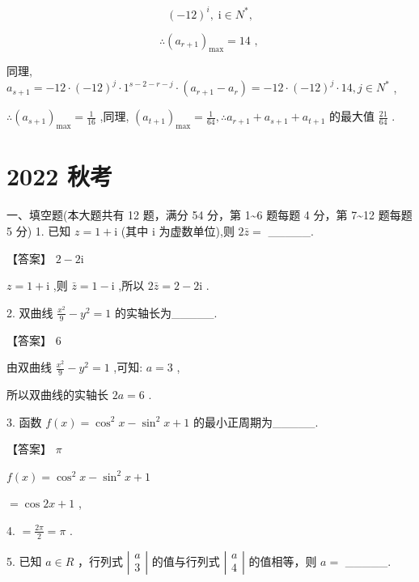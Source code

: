 \documentclass[10pt]{article}
\begin{document}
\[
{\left( -{12}\right) }^{i},\;\mathrm{i} \in  {N}^{ * },
\]

\[
\therefore {\left( {a}_{r + 1}\right) }_{\max } = {14}\text{ , }
\]

同理, \({a}_{s + 1} =  - {12} \cdot  {\left( -{12}\right) }^{j} \cdot  {1}^{s - 2 - r - j} \cdot  \left( {{a}_{r + 1} - {a}_{r}}\right)  =  - {12} \cdot  {\left( -{12}\right) }^{j} \cdot  {14},j \in  {N}^{ * }\) ,

\(\therefore {\left( {a}_{s + 1}\right) }_{\max } = \frac{1}{16}\) ,同理, \({\left( {a}_{t + 1}\right) }_{\max } = \frac{1}{64},\therefore {a}_{r + 1} + {a}_{s + 1} + {a}_{t + 1}\) 的最大值 \(\frac{21}{64}\) .

\section*{2022 秋考}

一、填空题(本大题共有 12 题，满分 54 分，第 1\textasciitilde 6 题每题 4 分，第 7\textasciitilde 12 题每题 5 分) 1. 已知 \(z = 1 + \mathrm{i}\) (其中 \(\mathrm{i}\) 为虚数单位),则 \(2\bar{z} =\) \_\_\_\_\_.

【答案】 \(2 - 2\mathrm{i}\)

\(z = 1 + \mathrm{i}\) ,则 \(\bar{z} = 1 - \mathrm{i}\) ,所以 \(2\bar{z} = 2 - 2\mathrm{i}\) .

2. 双曲线 \(\frac{{x}^{2}}{9} - {y}^{2} = 1\) 的实轴长为\_\_\_\_\_.

【答案】 6

由双曲线 \(\frac{{x}^{2}}{9} - {y}^{2} = 1\) ,可知: \(a = 3\) ,

所以双曲线的实轴长 \({2a} = 6\) .

3. 函数 \(f\left( x\right)  = {\cos }^{2}x - {\sin }^{2}x + 1\) 的最小正周期为\_\_\_\_\_.

【答案】 \(\pi\)

\(f\left( x\right)  = {\cos }^{2}x - {\sin }^{2}x + 1\)

\(= \cos {2x} + 1\) ,

4. \(= \frac{2\pi }{2} = \pi\) .

5. 已知 \(a \in  R\) ，行列式 \(\left| \begin{array}{l} a \\  3 \end{array}\right|\) 的值与行列式 \(\left| \begin{array}{l} a \\  4 \end{array}\right|\) 的值相等，则 \(a =\) \_\_\_\_\_.
\end{document}
